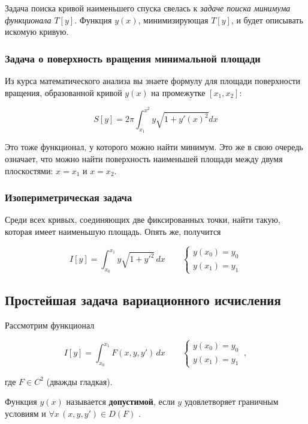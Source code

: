 \documentclass[12pt]{article}
\begin{document}
			Задача поиска кривой наименьшего спуска свелась к \textit{задаче поиска минимума функционала
			$T[y]$}. Функция $y(x)$, минимизирующая $T[y]$, и будет описывать искомую кривую.

		\subsubsection{Задача о поверхность вращения минимальной площади}

			Из курса математического анализа вы знаете формулу для площади поверхности вращения, образованной
			кривой $y(x)$ на промежутке $[x_1, x_2]$:

				$$S[y] = 2 \pi \int_{x_1}^{x^2} y \sqrt{1+y'(x)^2} dx$$

			Это тоже функционал, у которого можно найти минимум. Это же в свою очередь означает, что можно
			найти поверхность наименьшей площади между двумя плоскостями: $x=x_1$ и $x=x_2$.

		\subsubsection{Изопериметрическая задача}

	

			Среди всех кривых, соединяющих две фиксированных точки, найти такую, которая имеет наименьшую
			площадь. Опять же, получится
	
			$$I[y] = \int_{x_0}^{x_1} y\sqrt{1 + y'^2}\,dx \qquad \left\{
			\begin{aligned}
				y(x_0) = y_0 \\
				y(x_1) = y_1
			\end{aligned}
			\right.$$
	
	\subsection{Простейшая задача вариационного исчисления}
	
		Рассмотрим функционал
 
		$$I[y] = \int_{x_0}^{x_1} F(x,y,y') \,dx \qquad \left\{
		\begin{aligned}
			y(x_0) = y_0 \\
			y(x_1) = y_1
		\end{aligned}
		\right. ~ ,$$
	
		где $F\in C^2$ (дважды гладкая).

		\begin{defi}
			Функция $y(x)$ называется \textbf{допустимой}, если $y$ удовлетворяет граничным условиям и
			$\forall x\, (x, y, y')\in D(F)$ .
		\end{defi}
\end{document}
